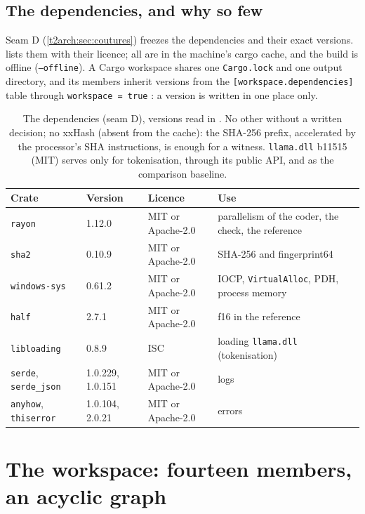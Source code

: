 \subsection{The dependencies, and why so few}

Seam D (\cref{t2arch:sec:coutures}) freezes the dependencies and their exact versions.  lists them with their licence; all are in the machine's cargo cache, and the build is offline (\texttt{--offline}). A Cargo workspace shares one \texttt{Cargo.lock} and one output directory, and its members inherit versions from the \texttt{[workspace.dependencies]} table through \texttt{workspace = true} \cite{cargo2026workspaces}: a version is written in one place only.

\begin{table}[ht]
\centering\small
\begin{tabularx}{\linewidth}{l l l >{\raggedright\arraybackslash}X}
\toprule
Crate & Version & Licence & Use \\
\midrule
\texttt{rayon} & 1.12.0 & MIT or Apache-2.0 & parallelism of the coder, the check, the reference \\
\texttt{sha2} & 0.10.9 & MIT or Apache-2.0 & SHA-256 and fingerprint64 \\
\texttt{windows-sys} & 0.61.2 & MIT or Apache-2.0 & IOCP, \texttt{VirtualAlloc}, PDH, process memory \\
\texttt{half} & 2.7.1 & MIT or Apache-2.0 & f16 in the reference \\
\texttt{libloading} & 0.8.9 & ISC & loading \texttt{llama.dll} (tokenisation) \\
\texttt{serde}, \texttt{serde\_json} & 1.0.229, 1.0.151 & MIT or Apache-2.0 & logs \\
\texttt{anyhow}, \texttt{thiserror} & 1.0.104, 2.0.21 & MIT or Apache-2.0 & errors \\
\bottomrule
\end{tabularx}
\caption[The dependencies (seam D)]{The dependencies (seam D), versions read in . No other without a written decision; no xxHash (absent from the cache): the SHA-256 prefix, accelerated by the processor's SHA instructions, is enough for a witness. \texttt{llama.dll} b11515 (MIT) serves only for tokenisation, through its public API, and as the comparison baseline.}
\label{t2arch:tab:deps}
\end{table}

\section{The workspace: fourteen members, an acyclic graph}\label{t2arch:sec:caisses}

